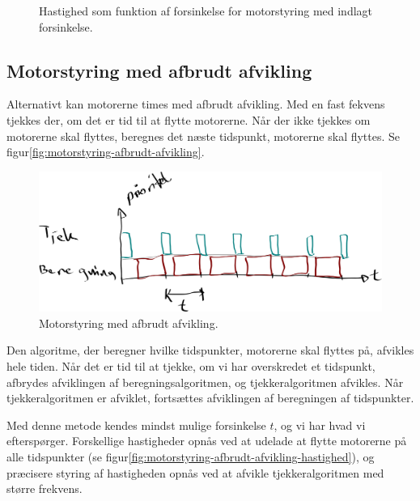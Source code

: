 \begin{figure}[htbp]
  \centering
  \vspace{3cm}
  \caption{Hastighed som funktion af forsinkelse for motorstyring med
    indlagt forsinkelse.}
  \label{fig:motorstyring-indlagt-forsinkelse-timing}
\end{figure}


\subsection{Motorstyring med afbrudt afvikling}

Alternativt kan motorerne times med afbrudt afvikling. Med en fast
fekvens tjekkes der, om det er tid til at flytte motorerne. Når der
ikke tjekkes om motorerne skal flyttes, beregnes det næste tidspunkt,
motorerne skal flyttes. Se
figur\vref{fig:motorstyring-afbrudt-afvikling}.

\begin{figure}[htbp]
  \centering
  \includegraphics[width=.8\textwidth]{../brugere/kjaergaard/motorstyring-afbrudt-afvikling}
  \caption{Motorstyring med afbrudt afvikling.}
  \label{fig:motorstyring-afbrudt-afvikling}
\end{figure}

Den algoritme, der beregner hvilke tidspunkter, motorerne skal flyttes
på, afvikles hele tiden. Når det er tid til at tjekke, om vi har
overskredet et tidspunkt, afbrydes afviklingen af
beregningsalgoritmen, og tjekkeralgoritmen afvikles. Når
tjekkeralgoritmen er afviklet, fortsættes
afviklingen af beregningen af tidspunkter.

Med denne metode kendes mindst mulige forsinkelse $t$, og vi har hvad
vi efterspørger. Forskellige hastigheder opnås ved at udelade at
flytte motorerne på alle tidspunkter (se
figur\vref{fig:motorstyring-afbrudt-afvikling-hastighed}), og
præcisere styring af hastigheden opnås ved at afvikle
tjekkeralgoritmen med større frekvens. 

